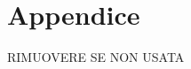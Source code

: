 \documentclass[../report.tex]{subfiles}
\begin{document}
\chapter{Appendice}\label{a:installazione}
RIMUOVERE SE NON USATA
\end{document}

